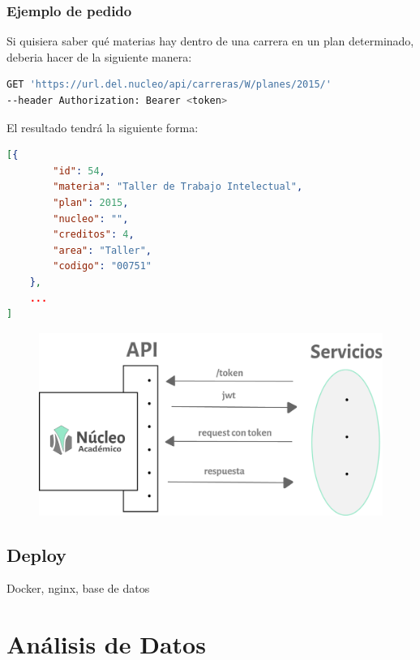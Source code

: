\subsubsection{Ejemplo de pedido}
Si quisiera saber qué materias hay dentro de una carrera en un plan determinado, deberia hacer de la siguiente manera:

\begin{lstlisting}[language=bash]
GET 'https://url.del.nucleo/api/carreras/W/planes/2015/'
--header Authorization: Bearer <token>
\end{lstlisting}

El resultado tendrá la siguiente forma:

\begin{lstlisting}[language=json,firstnumber=1]
[{
        "id": 54,
        "materia": "Taller de Trabajo Intelectual",
        "plan": 2015,
        "nucleo": "",
        "creditos": 4,
        "area": "Taller",
        "codigo": "00751"
    },
    ...
]
\end{lstlisting}

\begin{figure}[h!]
  \centering
    \includegraphics[scale=0.8]{images/nucleo/jwt.png}
  \label{fig:nucleo-jwt}
\end{figure}


\subsection{Deploy}

Docker, nginx, base de datos

\section[Análisis de Datos]{Análisis de Datos}

